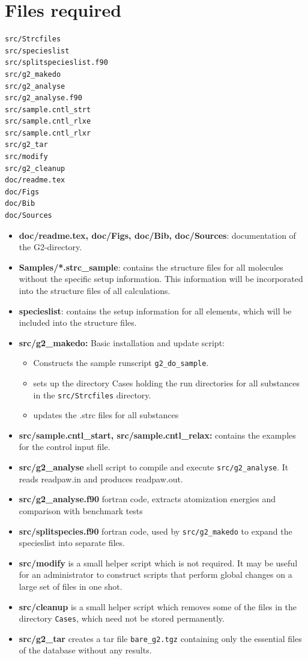 \documentclass{book}
\begin{document}
\section*{Files required}
\begin{verbatim}
src/Strcfiles         
src/specieslist
src/splitspecieslist.f90       
src/g2_makedo         
src/g2_analyse         
src/g2_analyse.f90       
src/sample.cntl_strt
src/sample.cntl_rlxe 
src/sample.cntl_rlxr
src/g2_tar
src/modify
src/g2_cleanup
doc/readme.tex
doc/Figs
doc/Bib
doc/Sources
\end{verbatim}

\begin{itemize}
%
\item \textbf{doc/readme.tex, doc/Figs, doc/Bib, doc/Sources}: documentation of
  the G2-directory.  
%
\item \textbf{Samples/*.strc\_sample}: contains the structure files
  for all molecules without the specific setup information. This
  information will be incorporated into the structure files of all
  calculations.
%
\item \textbf{specieslist}: contains the setup information
  for all elements, which will be included into the structure files.
%
\item \textbf{src/g2\_makedo:} Basic installation and update script:
  \begin{itemize}
     \item Constructs the sample runscript \verb+g2_do_sample+. 
     \item sets up the directory Cases holding the run directories for all
        substances in the \verb|src/Strcfiles| directory.
     \item updates the .strc files for all substances
    \end{itemize}
%
\item \textbf{src/sample.cntl\_start, src/sample.cntl\_relax:} 
    contains the examples for the control input file. 
%
\item \textbf{src/g2\_analyse} shell script to compile and execute
\verb|src/g2_analyse|. It reads readpaw.in and produces readpaw.out.
%
\item \textbf{src/g2\_analyse.f90} fortran code, extracts atomization
  energies and comparison with benchmark tests
%
\item \textbf{src/splitspecies.f90} fortran code, used by
  \verb|src/g2_makedo| to expand the specieslist into separate files.
%
\item \textbf{src/modify} is a small helper script which is not
  required. It may be useful for an administrator to construct scripts
  that perform global changes on a large set of files in one shot.
%
\item \textbf{src/cleanup} is a small helper script which removes some
  of the files in the directory \verb|Cases|, which need not be stored
  permanently.
%
\item \textbf{src/g2\_tar} creates a tar file \verb|bare_g2.tgz|
  containing only the essential files of the database without any
  results.
\end{itemize}
\end{document}
